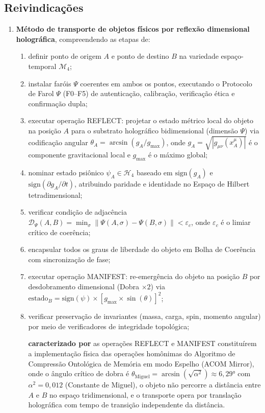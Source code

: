 \documentclass[12pt,a4paper]{article}
\newcommand{\alphaii}{\alpha^2}
\newcommand{\Dpsi}{\mathcal{D}_\Psi}
\newcommand{\Mcal}{\mathcal{M}_4}
\newcommand{\thetaM}{\theta_{\text{Miguel}}}
\newcommand{\epsc}{\varepsilon_c}
\begin{document}
\subsection*{Reivindicações}

\begin{enumerate}

\item \textbf{Método de transporte de objetos físicos por
reflexão dimensional holográfica}, compreendendo as etapas de:
  \begin{enumerate}[label=(\alph*)]
  \item definir ponto de origem $A$ e ponto de destino $B$ na
  variedade espaço-temporal $\Mcal$;
  \item instalar faróis $\Psi$ coerentes em ambos os pontos,
  executando o Protocolo de Farol $\Psi$ (F0--F5) de
  autenticação, calibração, verificação ética e confirmação
  dupla;
  \item executar operação REFLECT: projetar o estado métrico
  local do objeto na posição $A$ para o substrato holográfico
  bidimensional (dimensão $\Psi$) via codificação angular
  $\theta_A = \arcsin(g_A / g_{\max})$, onde $g_A =
  \sqrt{|g_{\mu\nu}(x^\mu_A)|}$ é o componente gravitacional
  local e $g_{\max}$ é o máximo global;
  \item nominar estado psiônico $\psi_A \in \mathcal{H}_4$
  baseado em $\text{sign}(g_A)$ e $\text{sign}(\partial g_A /
  \partial t)$, atribuindo paridade e identidade no Espaço de
  Hilbert tetradimensional;
  \item verificar condição de adjacência
  $\Dpsi(A,B) = \min_\sigma \|\Psi(A,\sigma) -
  \Psi(B,\sigma)\| < \epsc$, onde $\epsc$ é o limiar crítico
  de coerência;
  \item encapsular todos os graus de liberdade do objeto em
  Bolha de Coerência com sincronização de fase;
  \item executar operação MANIFEST: re-emergência do objeto na
  posição $B$ por desdobramento dimensional (Dobra $\times 2$)
  via $\text{estado}_B = \text{sign}(\psi) \times
  [g_{\max} \times \sin(\theta)]^2$;
  \item verificar preservação de invariantes (massa, carga,
  spin, momento angular) por meio de verificadores de
  integridade topológica;

  \textbf{caracterizado por} as operações REFLECT e MANIFEST
  constituírem a implementação física das operações homônimas
  do Algoritmo de Compressão Ontológica de Memória em modo
  Espelho (ACOM Mirror), onde o ângulo crítico de dobra
  é $\thetaM = \arcsin(\sqrt{\alphaii}) \approx 6{,}29°$
  com $\alphaii = 0{,}012$ (Constante de Miguel), o objeto
  não percorre a distância entre $A$ e $B$ no espaço
  tridimensional, e o transporte opera por translação
  holográfica com tempo de transição independente da
  distância.
  \end{enumerate}


\end{enumerate}
\end{document}
